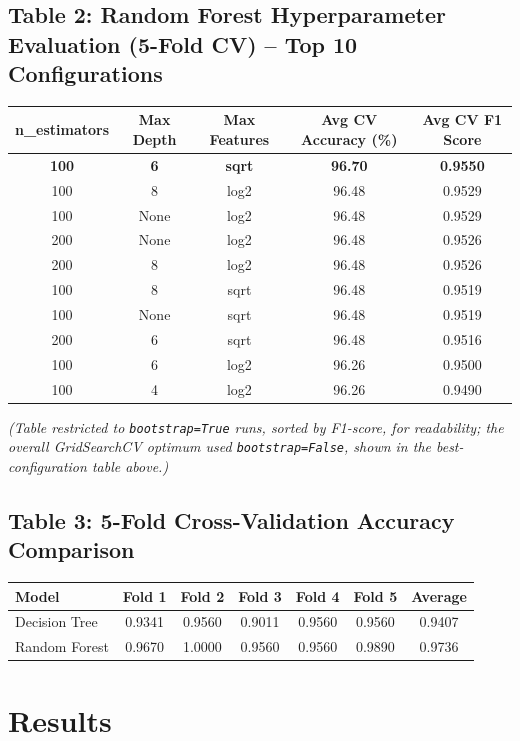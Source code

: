 \documentclass[12pt,a4paper]{article}
\begin{document}
\subsection*{Table 2: Random Forest Hyperparameter Evaluation (5-Fold CV) -- Top 10 Configurations}
\begin{longtable}{ccccc}
\toprule
n\_estimators & Max Depth & Max Features & Avg CV Accuracy (\%) & Avg CV F1 Score \\
\midrule
\textbf{100} & \textbf{6} & \textbf{sqrt} & \textbf{96.70} & \textbf{0.9550} \\
100 & 8 & log2 & 96.48 & 0.9529 \\
100 & None & log2 & 96.48 & 0.9529 \\
200 & None & log2 & 96.48 & 0.9526 \\
200 & 8 & log2 & 96.48 & 0.9526 \\
100 & 8 & sqrt & 96.48 & 0.9519 \\
100 & None & sqrt & 96.48 & 0.9519 \\
200 & 6 & sqrt & 96.48 & 0.9516 \\
100 & 6 & log2 & 96.26 & 0.9500 \\
100 & 4 & log2 & 96.26 & 0.9490 \\
\bottomrule
\end{longtable}
\emph{(Table restricted to \texttt{bootstrap=True} runs, sorted by F1-score, for readability; the
overall GridSearchCV optimum used \texttt{bootstrap=False}, shown in the best-configuration table
above.)}

\subsection*{Table 3: 5-Fold Cross-Validation Accuracy Comparison}
\begin{tabular}{lcccccc}
\toprule
Model & Fold 1 & Fold 2 & Fold 3 & Fold 4 & Fold 5 & Average \\
\midrule
Decision Tree & 0.9341 & 0.9560 & 0.9011 & 0.9560 & 0.9560 & 0.9407 \\
Random Forest & 0.9670 & 1.0000 & 0.9560 & 0.9560 & 0.9890 & 0.9736 \\
\bottomrule
\end{tabular}

\section{Results}
\end{document}
